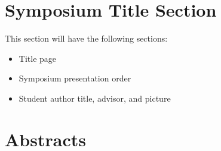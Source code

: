 \documentclass[12pt]{article}
\begin{document}
\section{Symposium Title Section}
This section will have the following sections:
\begin{itemize}
    \item Title page
    \item Symposium presentation order
    \item Student author title, advisor, and picture
\end{itemize}

\section{Abstracts}
    {}
\end{document}
